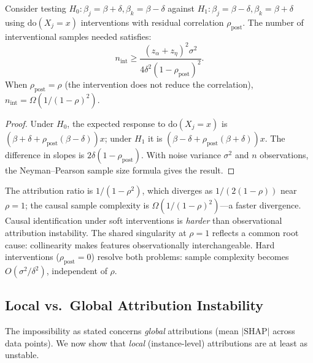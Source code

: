 \documentclass{jmlr}
\begin{document}
\begin{proposition}
\label{prop:causal-sample-complexity}
Consider testing $H_0: \beta_j = \beta + \delta, \beta_k = \beta - \delta$ against $H_1: \beta_j = \beta - \delta, \beta_k = \beta + \delta$ using $\text{do}(X_j = x)$ interventions with residual correlation $\rho_{\mathrm{post}}$. The number of interventional samples needed satisfies:
\[
    n_{\mathrm{int}} \geq \frac{(z_\alpha + z_\eta)^2 \sigma^2}{4\delta^2 (1 - \rho_{\mathrm{post}})^2}.
\]
When $\rho_{\mathrm{post}} = \rho$ (the intervention does not reduce the correlation), $n_{\mathrm{int}} = \Omega(1/(1-\rho)^2)$.
\end{proposition}

\begin{proof}
Under $H_0$, the expected response to $\text{do}(X_j = x)$ is $(\beta + \delta + \rho_{\mathrm{post}}(\beta - \delta))x$; under $H_1$ it is $(\beta - \delta + \rho_{\mathrm{post}}(\beta + \delta))x$. The difference in slopes is $2\delta(1 - \rho_{\mathrm{post}})$. With noise variance $\sigma^2$ and $n$ observations, the Neyman--Pearson sample size formula gives the result.
\end{proof}

The attribution ratio is $1/(1-\rho^2)$, which diverges as $1/(2(1-\rho))$ near $\rho = 1$; the causal sample complexity is $\Omega(1/(1-\rho)^2)$---a faster divergence. Causal identification under soft interventions is \emph{harder} than observational attribution instability. The shared singularity at $\rho = 1$ reflects a common root cause: collinearity makes features observationally interchangeable. Hard interventions ($\rho_{\mathrm{post}} = 0$) resolve both problems: sample complexity becomes $O(\sigma^2/\delta^2)$, independent of $\rho$.

\subsection{Local vs.\ Global Attribution Instability}
\label{sec:local-global}

The impossibility as stated concerns \emph{global} attributions (mean $|\text{SHAP}|$ across data points). We now show that \emph{local} (instance-level) attributions are at least as unstable.
\end{document}

